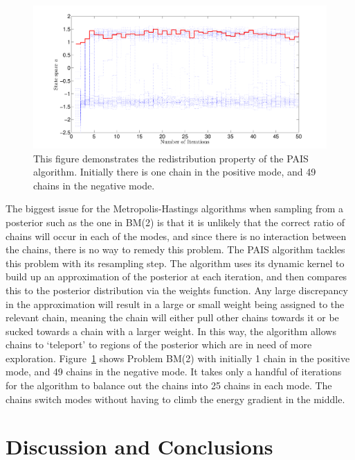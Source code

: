 \documentclass[final]{siamltex}
\begin{document}
\begin{figure}[!h]
\begin{center}
\includegraphics[width=\textwidth]{"figures/BM2_suction"}
\caption{This figure demonstrates the redistribution property of the PAIS algorithm. Initially there is one chain in the positive mode, and 49 chains in the negative mode.}
\label{fig:BM2_suction}
\end{center}
\end{figure}

The biggest issue for the Metropolis-Hastings algorithms when sampling
from a posterior such as the one in BM(2) is that it is unlikely that
the correct ratio of chains will occur in each of the modes, and since there is no interaction between the chains, there is no way to remedy this problem. The PAIS algorithm tackles this problem with its resampling step. The algorithm uses its dynamic kernel to build up an approximation of the posterior at each iteration, and then compares this to the posterior distribution via the weights function. Any large discrepancy in the approximation will result in a large or small weight being assigned to the relevant chain, meaning the chain will either pull other chains towards it or be sucked towards a chain with a larger weight. In this way, the algorithm allows chains to `teleport' to regions of the posterior which are in need of more exploration. Figure~\ref{fig:BM2_suction} shows Problem BM(2) with initially 1 chain in the positive mode, and 49 chains in the negative mode. It takes only a handful of iterations for the algorithm to balance out the chains into 25 chains in each mode. The chains switch modes without having to climb the energy gradient in the middle.

\section{Discussion and Conclusions}\label{Sec:Conc} 
\end{document}
